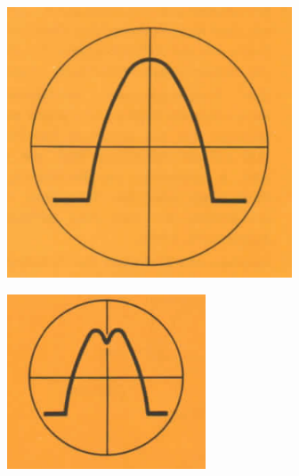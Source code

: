 \FloatBarrier
\begin{figure}
  \centering
  \begin{subfigure}{0.2\textwidth}
    \raggedleft
    \includegraphics[width=0.93\textwidth]{Versuch1.1.png}
    \caption{}
    \label{abb:Versuch1.1}
  \end{subfigure}
  \begin{subfigure}{0.2\textwidth}
    \centering
    \includegraphics[width=\textwidth]{Versuch1.2.png}

\end{subfigure}
\end{figure}
